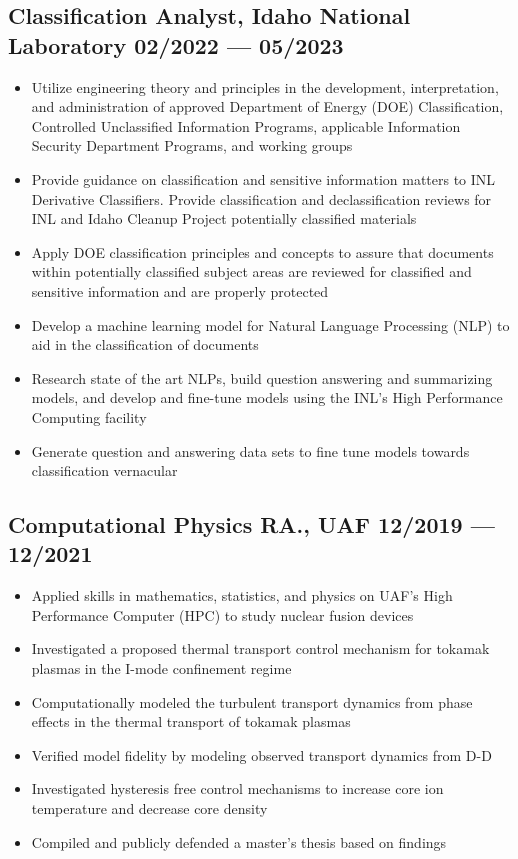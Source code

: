 \documentclass[letterpaper,11pt]{article}
\begin{document}
\subsection*{{\color{cvblue}Classification Analyst, Idaho National Laboratory } \hfill 02/2022 — 05/2023} 
 
\begin{itemize}
    \setlength{\itemsep}{-.5pt}
\item  Utilize engineering theory and principles in the development, interpretation, and administration of approved Department of Energy (DOE) Classification, Controlled Unclassified Information Programs, applicable Information
Security Department Programs, and working groups
\item  Provide guidance on classification and sensitive information matters to INL Derivative Classifiers. Provide classification and declassification reviews for INL and Idaho Cleanup Project potentially classified materials
\item  Apply DOE classification principles and concepts to assure that documents within potentially classified subject areas are reviewed for classified and sensitive information and are properly protected
\item  Develop a machine learning model for Natural Language Processing (NLP) to aid in the classification of documents
\item  Research state of the art NLPs, build question answering and summarizing models, and develop and fine-tune models using the INL’s High Performance Computing facility
\item  Generate question and answering data sets to fine tune models towards classification vernacular
\end{itemize}

\subsection*{{\color{cvblue}Computational Physics RA., UAF } \hfill 12/2019 --- 12/2021} 
    \begin{itemize}
    \setlength{\itemsep}{-.5pt}
    \item Applied skills in mathematics, statistics, and physics on UAF's High Performance Computer (HPC) to study nuclear fusion devices  
\item Investigated a proposed thermal transport control mechanism for tokamak plasmas in the I-mode confinement regime 
\item Computationally modeled the turbulent transport dynamics from phase effects in the thermal transport of tokamak plasmas
\item Verified model fidelity by modeling observed transport dynamics from D-D
\item Investigated hysteresis free control mechanisms to increase core ion temperature and decrease core density 
\item Compiled and publicly defended a master's thesis based on findings
    \end{itemize}
\end{document}
